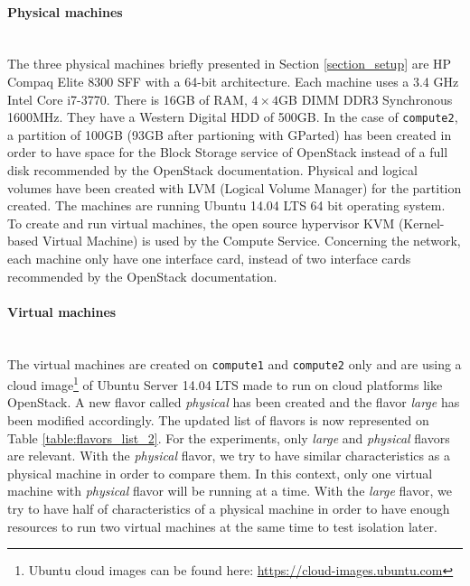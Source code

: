 \paragraph{Physical machines}\mbox{}\\
The three physical machines briefly presented in Section \ref{section_setup} are HP Compaq Elite 8300 SFF with a 64-bit architecture. 
Each machine uses a 3.4 GHz Intel Core i7-3770. 
There is 16GB of RAM, $4\times4$GB DIMM DDR3 Synchronous 1600MHz. 
They have a Western Digital HDD of 500GB. 
In the case of \texttt{compute2}, a partition of 100GB (93GB after partioning with GParted) has been created in order to have space for the Block Storage service of OpenStack instead of a full disk recommended by the OpenStack documentation. 
Physical and logical volumes have been created with LVM (Logical Volume Manager) for the partition created.
The machines are running Ubuntu 14.04 LTS 64 bit operating system. 
To create and run virtual machines, the open source hypervisor KVM (Kernel-based Virtual Machine) is used by the Compute Service. Concerning the network, each machine only have one interface card, instead of two interface cards recommended by the OpenStack documentation.



\paragraph{Virtual machines}\mbox{}\\
The virtual machines are created on \texttt{compute1} and \texttt{compute2} only and are using a cloud image\footnote{Ubuntu cloud images can be found here: \url{https://cloud-images.ubuntu.com}} of Ubuntu Server 14.04 LTS made to run on cloud platforms like OpenStack. 
A new flavor called \textit{physical} has been created and the flavor \textit{large} has been modified accordingly. 
The updated list of flavors is now represented on Table \ref{table:flavors_list_2}. 
For the experiments, only \textit{large} and \textit{physical} flavors are relevant. 
With the \textit{physical} flavor, we try to have similar characteristics as a physical machine in order to compare them. 
In this context, only one virtual machine with \textit{physical} flavor will be running at a time. 
With the \textit{large} flavor, we try to have half of characteristics of a physical machine in order to have enough resources to run two virtual machines at the same time to test isolation later.

